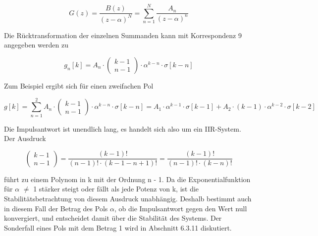 \begin{equation}\label{eq:sixsninetyfive}
G\left(z\right)=\frac{B\left(z\right)}{\left(z-\alpha \right)^{N} } =\sum _{n=1}^{N}\frac{A_{n} }{\left(z-\alpha \right)^{n} }
\end{equation}

\noindent Die R\"{u}cktransformation der einzelnen Summanden kann mit Korrespondenz 9 angegeben werden zu

\begin{equation}\label{eq:sixsninetysix}
g_{n} \left[k\right]=A_{n} \cdot \left(\begin{array}{c} {k-1} \\ {n-1} \end{array}\right)\cdot \alpha ^{k-n} \cdot \sigma \left[k-n\right]
\end{equation}

\noindent Zum Beispiel ergibt sich f\"{u}r einen zweifachen Pol

\begin{equation}\label{eq:sixsninetyseven}
g\left[k\right]=\sum _{n=1}^{2}A_{n} \cdot \left(\begin{array}{c} {k-1} \\ {n-1} \end{array}\right)\cdot \alpha ^{k-n} \cdot \sigma \left[k-n\right]=A_{1} \cdot \alpha ^{k-1} \cdot \sigma \left[k-1\right]+A_{2} \cdot \left(k-1\right)\cdot \alpha ^{k-2} \cdot \sigma \left[k-2\right]
\end{equation}

\noindent Die Impulsantwort ist unendlich lang, es handelt sich also um ein IIR-System. Der Ausdruck 

\begin{equation}\label{eq:sixsninetyeight}
\left(\begin{array}{l} {k-1} \\ {n-1} \end{array}\right)=\frac{\left(k-1\right)!}{\left(n-1\right)!\cdot \left(k-1-n+1\right)!} =\frac{\left(k-1\right)!}{\left(n-1\right)!\cdot \left(k-n\right)!}
\end{equation}

\noindent f\"{u}hrt zu einem Polynom in k mit der Ordnung n - 1. Da die Exponentialfunktion f\"{u}r $\alpha$ $\neq$ 1 st\"{a}rker steigt oder f\"{a}llt als jede Potenz von k, ist die Stabilit\"{a}tsbetrachtung von diesem Ausdruck unabh\"{a}ngig. Deshalb bestimmt auch in diesem Fall der Betrag des Pols $\alpha$, ob die Impulsantwort gegen den Wert null konvergiert, und entscheidet damit \"{u}ber die Stabilit\"{a}t des Systems. Der Sonderfall eines Pols mit dem Betrag 1 wird in Abschnitt 6.3.11 diskutiert.\bigskip

